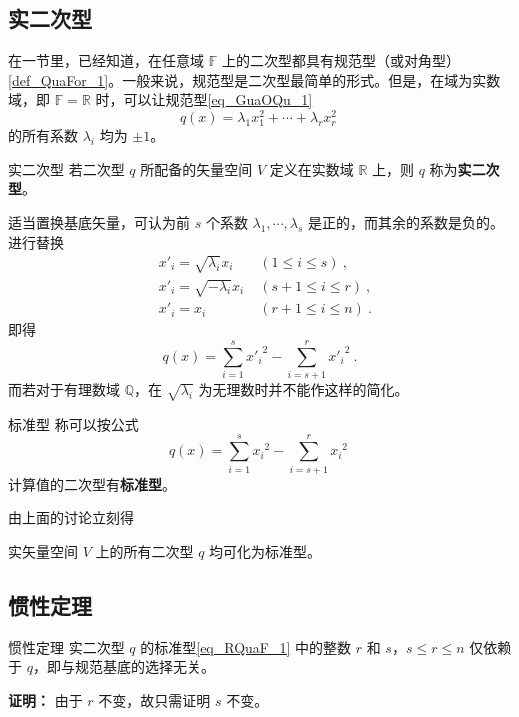 

\subsection{实二次型}
在一节里，已经知道，在任意域 $\mathbb F$ 上的二次型都具有规范型（或对角型）\autoref{def_QuaFor_1}。一般来说，规范型是二次型最简单的形式。但是，在域为实数域，即 $\mathbb F=\mathbb R$ 时，可以让规范型\autoref{eq_GuaOQu_1} 
\begin{equation}
q({x})=\lambda_1 x_1^2+\cdots+\lambda_r x_r^2~
\end{equation}
的所有系数 $\lambda_i$ 均为 $\pm 1$。
\begin{definition}{实二次型}
若二次型 $q$ 所配备的矢量空间 $V$ 定义在实数域 $\mathbb R$ 上，则 $q$ 称为\textbf{实二次型}。
\end{definition}
适当置换基底矢量，可认为前 $s$ 个系数 $\lambda_1,\cdots,\lambda_s$ 是正的，而其余的系数是负的。进行替换
\begin{equation}
\begin{aligned}
&x'_i=\sqrt{\lambda_i}x_i\;&(1\leq i\leq s)~,\\
&x'_i=\sqrt{-\lambda_i}x_i\;&(s+1\leq i\leq r)~,\\
&x'_i=x_i\; &(r+1\leq i\leq n)~.
\end{aligned}
\end{equation}
 即得
 \begin{equation}
 q({x})=\sum_{i=1}^{s}{x'_i}^2-\sum_{i=s+1}^{r} {x'_{i}}^{2}~.
 \end{equation}
 而若对于有理数域 $\mathbb Q$，在 $\sqrt{\lambda_i}$ 为无理数时并不能作这样的简化。
 
\begin{definition}{标准型}
称可以按公式
\begin{equation}\label{eq_RQuaF_1}
q( x)=\sum_{i=1}^{s}{x_i}^2-\sum_{i=s+1}^{r} {x_{i}}^{2}~
\end{equation}
计算值的二次型有\textbf{标准型}。
\end{definition}
由上面的讨论立刻得
\begin{theorem}{}\label{the_RQuaF_1}
实矢量空间 $V$ 上的所有二次型 $q$ 均可化为标准型。
\end{theorem}
\subsection{惯性定理}
\begin{theorem}{惯性定理}
实二次型 $q$ 的标准型\autoref{eq_RQuaF_1} 中的整数 $r$ 和 $s$，$s\leq r\leq n$ 仅依赖于 $q$，即与规范基底的选择无关。
\end{theorem}
\textbf{证明：} 由于 $r$ 不变，故只需证明 $s$ 不变。

